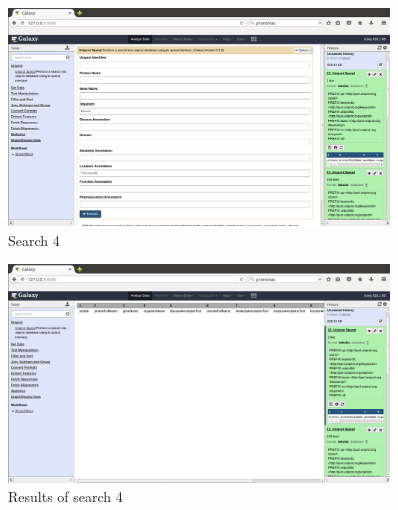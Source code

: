 \documentclass[12pt]{article}
\begin{document}
\begin{figure}[h]
	\includegraphics[width=0.9\textwidth]{figures/4a}
	\caption{Search 4}
	\label{fig:example_4a}
\end{figure}
\begin{figure}[h]
	\includegraphics[width=0.9\textwidth]{figures/4b}
	\caption{Results of search 4}
	\label{fig:example_4b}
\end{figure}
\end{document}

